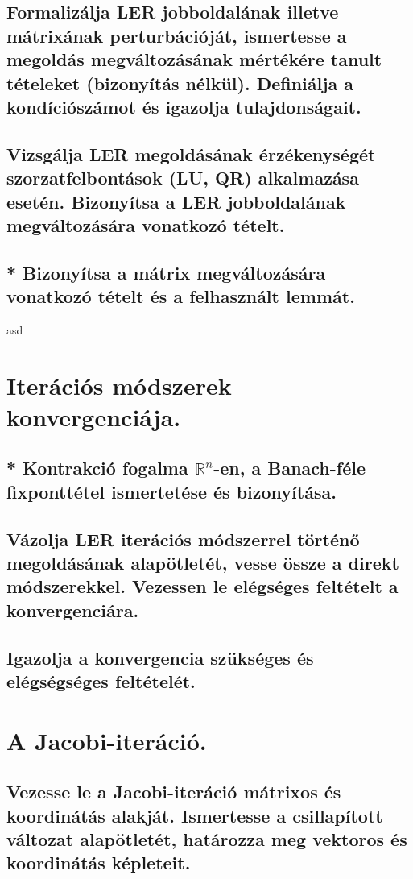 \documentclass{article}
\begin{document}
        \subsection{Formalizálja LER jobboldalának illetve mátrixának perturbációját, ismertesse a megoldás megváltozásának mértékére tanult tételeket (bizonyítás nélkül). Definiálja a kondíciószámot és igazolja tulajdonságait.}
        \subsection{Vizsgálja LER megoldásának érzékenységét szorzatfelbontások (LU, QR) alkalmazása esetén. Bizonyítsa a LER jobboldalának megváltozására vonatkozó tételt.}
        \subsection{* Bizonyítsa a mátrix megváltozására vonatkozó tételt és a felhasznált lemmát.}

asd
    \section{Iterációs módszerek konvergenciája.}
        \subsection{* Kontrakció fogalma $\mathbb{R}^n$-en, a Banach-féle fixponttétel ismertetése és bizonyítása.}
        \subsection{Vázolja LER iterációs módszerrel történő megoldásának alapötletét, vesse össze a direkt módszerekkel. Vezessen le elégséges feltételt a konvergenciára.}
        \subsection{Igazolja a konvergencia szükséges és elégségséges feltételét.}


    \section{A Jacobi-iteráció.}
        \subsection{Vezesse le a Jacobi-iteráció mátrixos és koordinátás alakját. Ismertesse a csillapított változat alapötletét, határozza meg vektoros és koordinátás képleteit.}
\end{document}
